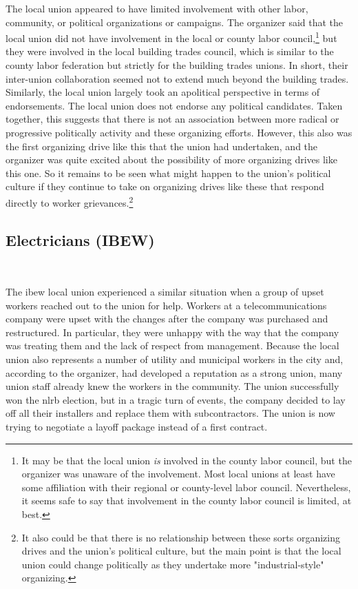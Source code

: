 \documentclass[12pt]{article}
\begin{document}
The local union appeared to have limited involvement with other labor, community, or political organizations or campaigns. The organizer said that the local union did not have involvement in the local or county labor council,\footnote{It may be that the local union \emph{is} involved in the county labor council, but the organizer was unaware of the involvement. Most local unions at least have some affiliation with their regional or county-level labor council. Nevertheless, it seems safe to say that involvement in the county labor council is limited, at best.} but they were involved in the local building trades council, which is similar to the county labor federation but strictly for the building trades unions. In short, their inter-union collaboration seemed not to extend much beyond the building trades. Similarly, the local union largely took an apolitical perspective in terms of endorsements. The local union does not endorse any political candidates. Taken together, this suggests that there is not an association between more radical or progressive politically activity and these organizing efforts. However, this also was the first organizing drive like this that the union had undertaken, and the organizer was quite excited about the possibility of more organizing drives like this one. So it remains to be seen what might happen to the union's political culture if they continue to take on organizing drives like these that respond directly to worker grievances.\footnote{It also could be that there is no relationship between these sorts organizing drives and the union's political culture, but the main point is that the local union could change politically as they undertake more "industrial-style" organizing.}

\subsection{Electricians (IBEW)}\

The \acrshort{ibew} local union experienced a similar situation when a group of upset workers reached out to the union for help. Workers at a telecommunications company were upset with the changes after the company was purchased and restructured. In particular, they were unhappy with the way that the company was treating them and the lack of respect from management. Because the local union also represents a number of utility and municipal workers in the city and, according to the organizer, had developed a reputation as a strong union, many union staff already knew the workers in the community. The union successfully won the \acrshort{nlrb} election, but in a tragic turn of events, the company decided to lay off all their installers and replace them with subcontractors. The union is now trying to negotiate a layoff package instead of a first contract.
\end{document}
